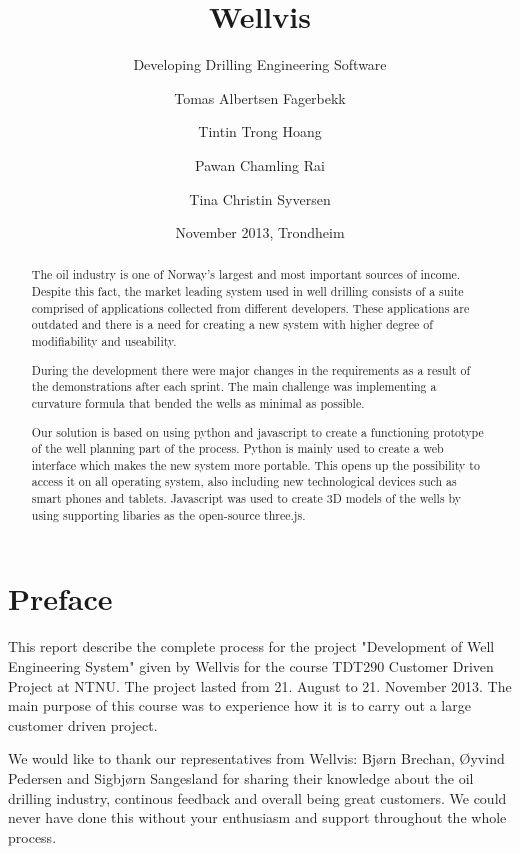 \documentclass{report}
\title{Wellvis}
\subtitle{Developing Drilling Engineering Software}
\author{Tomas Albertsen Fagerbekk \and Tintin Trong Hoang \and Pawan Chamling Rai \and Tina Christin Syversen}
\date{November 2013, Trondheim}
\begin{document}
\maketitle

\newpage


\begin{abstract}
The oil industry is one of Norway's largest and most important sources of income. Despite this fact, the market leading system used in well drilling consists of a suite comprised of applications collected from different developers. These applications are outdated and there is a need for creating a new system with higher degree of modifiability and useability.

During the development there were major changes in the requirements as a result of the demonstrations after each sprint. The main challenge was implementing a curvature formula that bended the wells as minimal as possible.

Our solution is based on using python and javascript to create a functioning prototype of the well planning part of the process. Python is mainly used to create a web interface which makes the new system more portable. This opens up the possibility to access it on all operating system, also including new technological devices such as smart phones and tablets. Javascript was used to create 3D models of the wells by using supporting libaries as the open-source three.js.




\end{abstract}


\section*{Preface}
This report describe the complete process for the project "Development of Well Engineering System" given by Wellvis for the course TDT290 Customer Driven Project at NTNU. The project lasted from 21. August to 21. November 2013. The main purpose of this course was to experience how it is to carry out a large customer driven project.

We would like to thank our representatives from Wellvis: Bjørn Brechan, Øyvind Pedersen and Sigbjørn Sangesland for sharing their knowledge about the oil drilling industry, continous feedback and overall being great customers. We could never have done this without your enthusiasm and support throughout the whole process.
\end{document}
